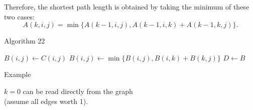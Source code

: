\begin{frame}
Therefore, the shortest path
length is obtained by taking the minimum of these two cases:
$$
A(k,i,j) = \min \{ A(k-1,i,j), A(k-1,i,k) + A(k-1,k,j) \}.
$$
\end{frame}

\begin{frame}
{Algorithm 22}

\begin{algorithmic}[1]
          \STATE $B(i,j)\longleftarrow C(i,j)$
     \ENDFOR
\ENDFOR
{}
               \STATE $B(i,j)\longleftarrow\min\{B(i,j),B(i,k)+B(k,j)\}$
          \ENDFOR
     \ENDFOR
\ENDFOR
\RETURN $D\longleftarrow B$
\end{algorithmic}
\end{frame}

\begin{frame}
{Example}


$k=0$ can be read directly from the graph \\
(assume all edges worth 1).
\end{frame}

